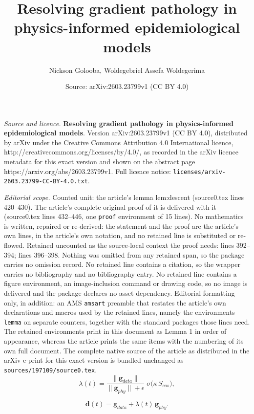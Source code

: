 \documentclass[10pt,a4paper]{amsart}
\title{\textbf{Resolving gradient pathology in physics-informed epidemiological models}}
\author{Nickson Golooba, Woldegebriel Assefa Woldegerima}
\date{Source: arXiv:2603.23799v1 (CC BY 4.0)}
\begin{document}
\maketitle

\noindent\emph{Source and licence.} \textbf{Resolving gradient pathology in physics-informed epidemiological models}. Version arXiv:2603.23799v1 (CC BY 4.0), distributed by arXiv under the Creative Commons Attribution 4.0 International licence, http://creativecommons.org/licenses/by/4.0/, as recorded in the arXiv licence metadata for this exact version and shown on the abstract page https://arxiv.org/abs/2603.23799v1. Full licence notice: \texttt{licenses/arxiv-2603.23799-CC-BY-4.0.txt}.\par\smallskip

\noindent\textit{Editorial scope.} Counted unit: the article's lemma lem:descent (source0.tex lines 420--430). The article's complete original proof of it is delivered with it (source0.tex lines 432--446, one \texttt{proof} environment of 15 lines). No mathematics is written, repaired or re-derived: the statement and the proof are the article's own lines, in the article's own notation, and no retained line is substituted or re-flowed.  Retained uncounted as the source-local context the proof needs: lines 392--394; lines 396--398.  Nothing was omitted from any retained span, so the package carries no omission record.  No retained line contains a citation, so the wrapper carries no bibliography and no bibliography entry.  No retained line contains a figure environment, an image-inclusion command or drawing code, so no image is delivered and the package declares no asset dependency.  Editorial formatting only, in addition: an AMS \texttt{amsart} preamble that restates the article's own declarations and macros used by the retained lines, namely the environments \texttt{lemma} on separate counters, together with the standard packages those lines need.  The retained environments print in this document as Lemma 1 in order of appearance, whereas the article prints the same items with the numbering of its own full document.  The complete native source of the article as distributed in the arXiv e-print for this exact version is bundled unchanged as \texttt{sources/197109/source0.tex}.
\begin{equation}\label{eq:lambda_inst}
\lambda(t) = \frac{\|\mathbf{g}_{data}\|}{\|\mathbf{g}_{phy}\| + \epsilon}\; \sigma\bigl(\kappa\, S_{cos}\bigr),
\end{equation}

\begin{equation}\label{eq:core_update}
\mathbf{d}(t) = \mathbf{g}_{data} + \lambda(t)\, \mathbf{g}_{phy}.
\end{equation}
\end{document}

